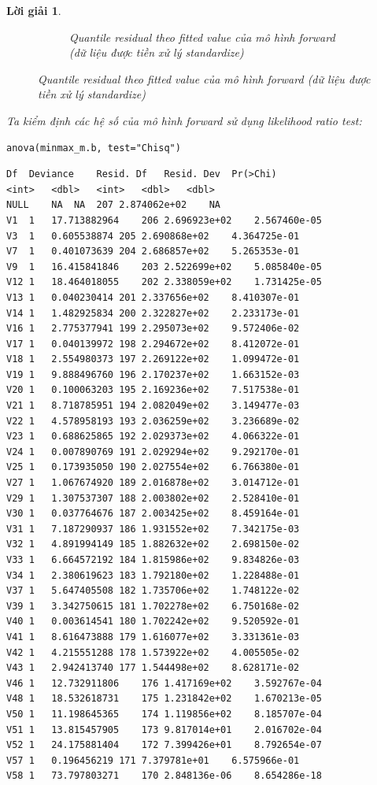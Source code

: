 \documentclass[14pt, a4paper]{article}
\theoremstyle{sltheorem}
\theoremstyle{soltheorem}
\newtheorem*{loigiai}{Lời giải}
\begin{document}
\begin{loigiai}
\begin{figure}[h!]
\begin{subfigure}[b]{0.4\textwidth}
            \caption{Quantile residual theo fitted value của mô hình forward (dữ liệu được tiền xử lý standardize)}
        \end{subfigure}
        \label{fig:Quantile-fitted-mf}
    \end{figure}

    Ta kiểm định các hệ số của mô hình forward sử dụng likelihood ratio test:

    \begin{verbatim}
anova(minmax_m.b, test="Chisq")
    \end{verbatim}

    \begin{verbatim}
Df	Deviance	Resid. Df	Resid. Dev	Pr(>Chi)
<int>	<dbl>	<int>	<dbl>	<dbl>
NULL	NA	NA	207	2.874062e+02	NA
V1	1	17.713882964	206	2.696923e+02	2.567460e-05
V3	1	0.605538874	205	2.690868e+02	4.364725e-01
V7	1	0.401073639	204	2.686857e+02	5.265353e-01
V9	1	16.415841846	203	2.522699e+02	5.085840e-05
V12	1	18.464018055	202	2.338059e+02	1.731425e-05
V13	1	0.040230414	201	2.337656e+02	8.410307e-01
V14	1	1.482925834	200	2.322827e+02	2.233173e-01
V16	1	2.775377941	199	2.295073e+02	9.572406e-02
V17	1	0.040139972	198	2.294672e+02	8.412072e-01
V18	1	2.554980373	197	2.269122e+02	1.099472e-01
V19	1	9.888496760	196	2.170237e+02	1.663152e-03
V20	1	0.100063203	195	2.169236e+02	7.517538e-01
V21	1	8.718785951	194	2.082049e+02	3.149477e-03
V22	1	4.578958193	193	2.036259e+02	3.236689e-02
V23	1	0.688625865	192	2.029373e+02	4.066322e-01
V24	1	0.007890769	191	2.029294e+02	9.292170e-01
V25	1	0.173935050	190	2.027554e+02	6.766380e-01
V27	1	1.067674920	189	2.016878e+02	3.014712e-01
V29	1	1.307537307	188	2.003802e+02	2.528410e-01
V30	1	0.037764676	187	2.003425e+02	8.459164e-01
V31	1	7.187290937	186	1.931552e+02	7.342175e-03
V32	1	4.891994149	185	1.882632e+02	2.698150e-02
V33	1	6.664572192	184	1.815986e+02	9.834826e-03
V34	1	2.380619623	183	1.792180e+02	1.228488e-01
V37	1	5.647405508	182	1.735706e+02	1.748122e-02
V39	1	3.342750615	181	1.702278e+02	6.750168e-02
V40	1	0.003614541	180	1.702242e+02	9.520592e-01
V41	1	8.616473888	179	1.616077e+02	3.331361e-03
V42	1	4.215551288	178	1.573922e+02	4.005505e-02
V43	1	2.942413740	177	1.544498e+02	8.628171e-02
V46	1	12.732911806	176	1.417169e+02	3.592767e-04
V48	1	18.532618731	175	1.231842e+02	1.670213e-05
V50	1	11.198645365	174	1.119856e+02	8.185707e-04
V51	1	13.815457905	173	9.817014e+01	2.016702e-04
V52	1	24.175881404	172	7.399426e+01	8.792654e-07
V57	1	0.196456219	171	7.379781e+01	6.575966e-01
V58	1	73.797803271	170	2.848136e-06	8.654286e-18
    \end{verbatim}


\end{loigiai}
\end{document}

